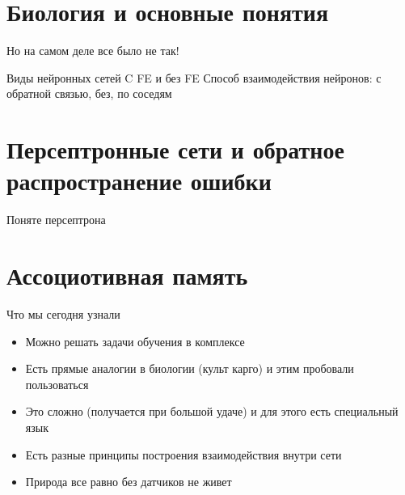 \documentclass[14pt, fleqn, xcolor={dvipsnames, table}]{beamer}
\begin{document}
\section{Биология и основные понятия} %
\begin{frame}{}
\begin{center}
\Huge
Но на самом деле все было не так!
\end{center}
\end{frame}

\begin{frame}{Виды нейронных сетей}
C FE и без FE
Способ взаимодействия нейронов: с обратной связью, без, по соседям

\end{frame}

\section{Персептронные сети и обратное распространение ошибки} %
\begin{frame}{Поняте персептрона}
\end{frame}


\section{Ассоциотивная память} %

\begin{frame}{Что мы сегодня узнали}
\begin{itemize}
  \item Можно решать задачи обучения в комплексе
  \item Есть прямые аналогии в биологии (культ карго) и этим пробовали пользоваться
  \item Это сложно (получается при большой удаче) и для этого есть специальный язык
  \item Есть разные принципы построения взаимодействия внутри сети
  \item Природа все равно без датчиков не живет
\end{itemize}
\end{frame}
\end{document}
